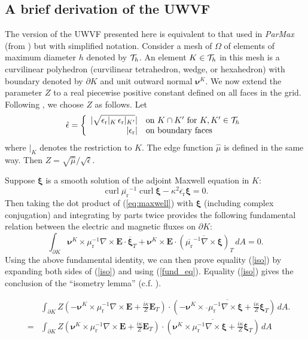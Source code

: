 \documentclass[a4paper,12pt]{article}
\newcommand{\bfE}{\mathbf{E}}
\newcommand{\bfnu}{\boldsymbol{\nu}}
\DeclareMathOperator{\curl}{curl}
\newcommand{\epsr}{\epsilon_{\mathrm{r}}}
\newcommand{\mur}{\mu_{\mathrm{r}}}
\newcommand{\bfxi}{\boldsymbol{\xi}}
\begin{document}
\subsection{A brief derivation of the UWVF}

The version of the UWVF presented here is equivalent to that used in
\emph{ParMax} (from \cite{cessenat_phd}) but with simplified
notation. Consider a mesh of $\Omega$ of elements of maximum diameter
$h$ denoted by ${\cal T}_h$.  An element $K\in {\cal T}_h$ in this
mesh is a curvilinear polyhedron (curvilinear tetrahedron, wedge, or
hexahedron) with boundary denoted by $\partial K$ and unit outward
normal $\bfnu^K$. We now extend the parameter $Z$ to a real piecewise
positive constant defined on all faces in the grid.  Following
\cite{cessenat_phd}, we choose $Z$ as follows. Let
\[\hat{\epsilon}=\left\{\begin{array}{rl}
|\sqrt{\epsr|_K\,\epsr|_{K'}}|& \mbox{on } K\cap K' \mbox{ for }K,K'\in{\cal T}_h\\
|{\epsr}|&\mbox{on boundary faces}\end{array}\right.
\]
where $|_K$ denotes the restriction to $K$. The edge function
$\hat{\mu}$ is defined in the same way.  Then
$Z=\sqrt{\hat{\mu}}/\sqrt{\hat{\epsilon}}$.
    
Suppose $\bfxi$ is a smooth solution of the adjoint Maxwell equation
in $K$:
\begin{equation}
\curl\overline{\mur}^{-1}\curl \bfxi-\kappa^2\overline{\epsr}\bfxi=0.
\label{max_adj}
\end{equation}
Then taking the dot product of (\ref{eq:maxwell}) with $\bfxi$ (including complex conjugation) and integrating by parts twice provides the following fundamental relation between the electric and magnetic fluxes on $\partial K$:
\begin{equation}
\int_{\partial K}{\bfnu^K\times\mur^{-1}\nabla\times\bfE}\cdot\overline{\bfxi}_T+{\bfnu^K\times\bfE}\cdot(\overline{\overline{\mur}^{-1}\nabla\times\bfxi})_T\,dA=0.\label{fund_eq}
\end{equation}
Using the above fundamental identity, we can then prove equality
(\ref{iso}) by expanding both sides of (\ref{iso}) and using
(\ref{fund_eq}). Equality (\ref{iso}) gives the conclusion of the
``isometry lemma'' (c.f. \cite{cessenat_phd}).

\begin{eqnarray}
&&\int_{\partial K}Z\left(-
\bfnu^K\times\mur^{-1}\nabla\times\bfE+\frac{i\kappa{}}{Z} \bfE_T\right)\cdot\left(-\overline{\bfnu^K\times{\overline{}}\mur^{-1}\nabla\times\bfxi+\frac{i\kappa{}}{Z} \bfxi_T}\right)\,dA.\nonumber\\
&=&\int_{\partial K}Z\left(
\bfnu^K\times\mur^{-1}\nabla\times\bfE+\frac{i\kappa{}}{Z} \bfE_T\right)\cdot\left(\overline{\bfnu^K\times{}\mur^{-1}\nabla\times\bfxi+\frac{i\kappa{}}{Z} \bfxi_T}\right)\,dA\label{iso}
\end{eqnarray}
\end{document}
